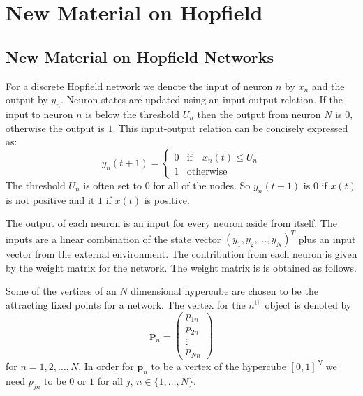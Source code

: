 \chapter{New Material on Hopfield}


\section{New Material on Hopfield Networks}


   For a discrete Hopfield network we denote the input of neuron $n$ by $x_n$ 
and the output by $y_n$.  Neuron states are updated using an input-output 
relation.  If the input to neuron $n$ is below the threshold $U_n$ then the
output from neuron $N$ is $0$, otherwise the output is $1$.  This input-output
relation can be concisely expressed as:
\begin{equation}\label{E:hopIO}
   y_n(t+1) = 
\left\{
\begin{array}{ll}
0 & \mbox{if} \quad x_n(t) \leq U_n   \\
1 & \mathrm{otherwise} 
\end{array}\right.
\end{equation}
The threshold $U_n$ is often set to $0$ for all of the nodes.  So $y_n(t+1)$ is 
$0$ if $x(t)$ is not positive and it $1$ if $x(t)$ is positive.  

   The output of each neuron is an input for every neuron aside from itself.
The inputs are a linear combination of the state vector $(y_1, y_2, \ldots,
y_N)^T$ plus an input vector from the external environment.  The contribution
from each neuron is given by the weight matrix for the network.  The weight
matrix is is obtained as follows.

   Some of the vertices of an $N$ dimensional hypercube are chosen to be the 
attracting fixed points for a network.  The vertex for the $n^{\mathrm{th}}$ 
object is denoted by 
\begin{equation*}
\boldsymbol{p}_n =
\begin{pmatrix}
p_{1n} \\ p_{2n} \\ \vdots \\ p_{Nn}
\end{pmatrix}
\end{equation*}
for $n = 1,2, \ldots, N$.  In order for $\boldsymbol{p}_n$ to be a vertex
of the hypercube $[0,1]^N$ we need $p_{jn}$ to be $0$ or $1$ for all $j$, $n 
\in \{1, \ldots, N\}$.

